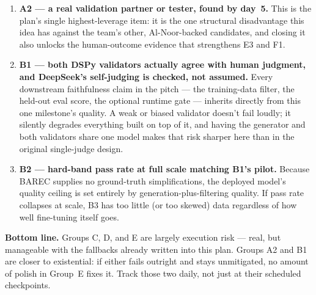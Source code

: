 \documentclass[11pt,a4paper]{article}
\begin{document}
\begin{enumerate}[leftmargin=1.6em]
  \item \textbf{A2 --- a real validation partner or tester, found by day~5.}
  This is the plan's single highest-leverage item: it is the one structural
  disadvantage this idea has against the team's other, Al-Noor-backed
  candidates, and closing it also unlocks the human-outcome evidence that
  strengthens E3 and F1.
  \item \textbf{B1 --- both DSPy validators actually agree with human
  judgment, and DeepSeek's self-judging is checked, not assumed.} Every
  downstream faithfulness claim in the pitch --- the training-data filter,
  the held-out eval score, the optional runtime gate --- inherits directly
  from this one milestone's quality. A weak or biased validator doesn't fail
  loudly; it silently degrades everything built on top of it, and having the
  generator and both validators share one model makes that risk sharper
  here than in the original single-judge design.
  \item \textbf{B2 --- hard-band pass rate at full scale matching B1's
  pilot.} Because BAREC supplies no ground-truth simplifications, the
  deployed model's quality ceiling is set entirely by generation-plus-filtering
  quality. If pass rate collapses at scale, B3 has too little (or too skewed) data
  regardless of how well fine-tuning itself goes.
\end{enumerate}

\begin{noteb}
\textbf{Bottom line.} Groups C, D, and E are largely execution risk ---
real, but manageable with the fallbacks already written into this plan.
Groups A2 and B1 are closer to existential: if either fails outright and
stays unmitigated, no amount of polish in Group~E fixes it. Track those two
daily, not just at their scheduled checkpoints.
\end{noteb}
\end{document}
